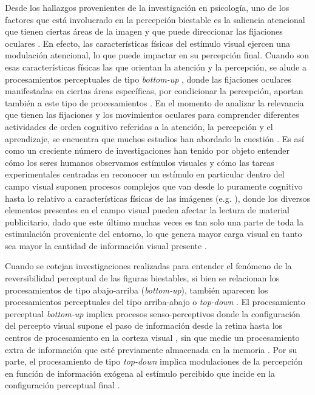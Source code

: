 \documentclass[spanish]{textolivre}
\begin{document}
Desde los hallazgos provenientes de la investigación en psicología, uno de los factores que está involucrado en la percepción biestable es la saliencia atencional que tienen ciertas áreas de la imagen y que puede direccionar las fijaciones oculares \cite{rodriguez-martinez_ocular_2021}. En efecto, las características físicas del estímulo visual ejercen una modulación atencional, lo que puede impactar en su percepción final. Cuando son esas características físicas las que orientan la atención y la percepción, se alude a procesamientos perceptuales de tipo \textit{bottom-up} \cite{hsiao_assessing_2012}, donde las fijaciones oculares manifestadas en ciertas áreas específicas, por condicionar la percepción, aportan también a este tipo de procesamientos \cite{belardinelli_bottom-up_2007}. En el momento de analizar la relevancia que tienen las fijaciones y los movimientos oculares para comprender diferentes actividades de orden cognitivo referidas a la atención, la percepción y el aprendizaje, se encuentra que muchos estudios han abordado la cuestión \cite{rosa_what_2015}. Es así como un creciente número de investigaciones han tenido por objeto entender cómo los seres humanos observamos estímulos visuales y cómo las tareas experimentales centradas en reconocer un estímulo en particular dentro del campo visual suponen procesos complejos que van desde lo puramente cognitivo hasta lo relativo a características físicas de las imágenes (e.g. \textcite{geyer_cross-trial_2006,maljkovic_priming_2000,muller_visual_1995,treisman_features_1988,weidner_top-down_2002}), donde los diversos elementos presentes en el campo visual pueden afectar la lectura de material publicitario, dado que este último muchas veces es tan solo una parte de toda la estimulación proveniente del entorno, lo que genera mayor carga visual en tanto sea mayor la cantidad de información visual presente \cite{arango_contaminacion_2021}.

Cuando se cotejan investigaciones realizadas para entender el fenómeno de la reversibilidad perceptual de las figuras biestables, si bien se relacionan los procesamientos de tipo abajo-arriba (\textit{bottom-up}), también aparecen los procesamientos perceptuales del tipo arriba-abajo o \textit{top-down} \cite{kornmeier_ambiguous_2012,leopold_multistable_1999,long_enduring_2004,long_as_1983}. El procesamiento perceptual \textit{bottom-up} implica procesos senso-perceptivos donde la configuración del percepto visual supone el paso de información desde la retina hasta los centros de procesamiento en la corteza visual \cite{fan_bottom-up_2020}, sin que medie un procesamiento extra de información que esté previamente almacenada en la memoria \cite{rodriguez-martinez_bistable_2018}. Por su parte, el procesamiento de tipo \textit{top-down} implica modulaciones de la percepción en función de información exógena al estímulo percibido que incide en la configuración perceptual final \cite{marroquin-ciendua_modulacion_2020}.
\end{document}
